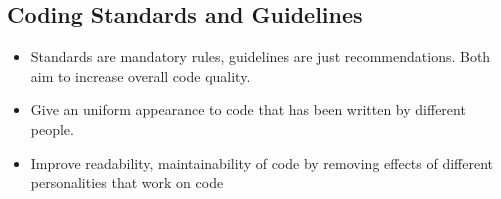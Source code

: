 \documentclass{article}
\begin{document}
\subsection{Coding Standards and Guidelines}
\begin{itemize}
    \item Standards are mandatory rules, guidelines are just recommendations. Both aim to increase overall code quality.
    
    \item Give an uniform appearance to code that has been written by different people. 
    
    \item Improve readability, maintainability of code by removing effects of different personalities that work on code
\end{itemize}
\end{document}
